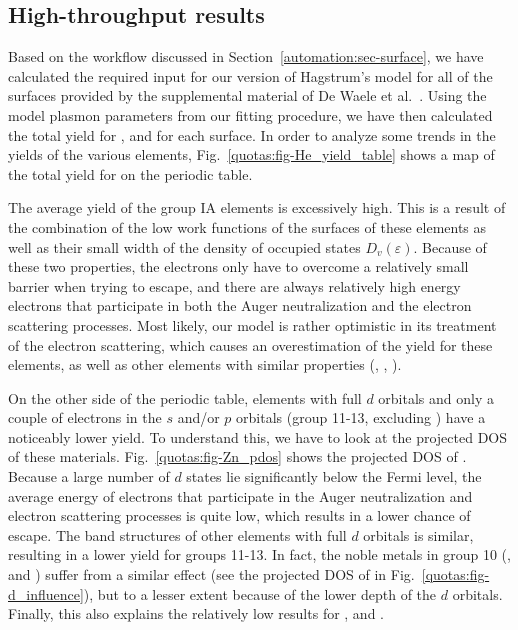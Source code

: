 \begin{refsection}

\clearpage
\subsection{High-throughput results}

Based on the workflow discussed in Section~\ref{automation:sec-surface}, we have calculated the required input for our version of Hagstrum's model for all of the surfaces provided by the supplemental material of De Waele et al.~\cite{DeWaele2016}. Using the model plasmon parameters from our fitting procedure, we have then calculated the total yield for ,  and  for each surface. In order to analyze some trends in the yields of the various elements, Fig.~\ref{quotas:fig-He_yield_table} shows a map of the total yield for  on the periodic table. 

The average yield of the group IA elements is excessively high. This is a result of the combination of the low work functions of the surfaces of these elements as well as their small width of the density of occupied states $D_v(\varepsilon)$. Because of these two properties, the electrons only have to overcome a relatively small barrier when trying to escape, and there are always relatively high energy electrons that participate in both the Auger neutralization and the electron scattering processes. Most likely, our model is rather optimistic in its treatment of the electron scattering, which causes an overestimation of the yield for these elements, as well as other elements with similar properties (, , ).

On the other side of the periodic table, elements with full $d$ orbitals and only a couple of electrons in the $s$ and/or $p$ orbitals (group 11-13, excluding ) have a noticeably lower yield.  To understand this, we have to look at the projected DOS of these materials. Fig.~\ref{quotas:fig-Zn_pdos} shows the projected DOS of . Because a large number of $d$ states lie significantly below the Fermi level, the average energy of electrons that participate in the Auger neutralization and electron scattering processes is quite low, which results in a lower chance of escape. The band structures of other elements with full $d$ orbitals is similar, resulting in a lower yield for groups 11-13. In fact, the noble metals in group 10 (,  and ) suffer from a similar effect (see the projected DOS of  in Fig.~\ref{quotas:fig-d_influence}), but to a lesser extent because of the lower depth of the $d$ orbitals. Finally, this also explains the relatively low results for ,  and .


\end{refsection}
